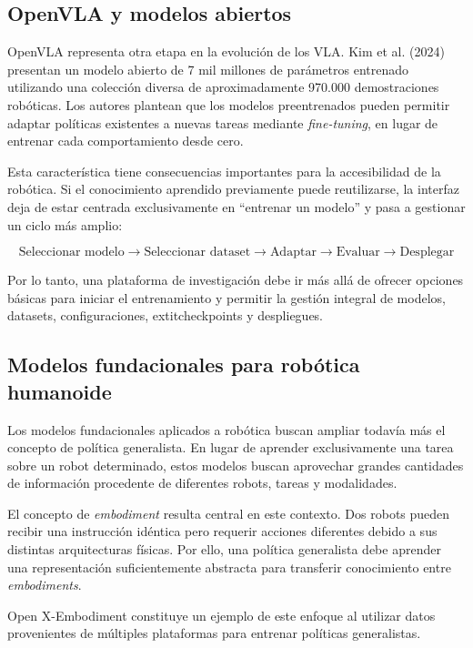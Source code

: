 \documentclass[stu,12pt,floatsintext]{apa7}
\begin{document}
\subsection{OpenVLA y modelos abiertos}

OpenVLA representa otra etapa en la evolución de los VLA. Kim et al. (2024) presentan un modelo abierto de 7 mil millones de parámetros entrenado utilizando una colección diversa de aproximadamente 970.000 demostraciones robóticas. Los autores plantean que los modelos preentrenados pueden permitir adaptar políticas existentes a nuevas tareas mediante \textit{fine-tuning}, en lugar de entrenar cada comportamiento desde cero.

Esta característica tiene consecuencias importantes para la accesibilidad de la robótica. Si el conocimiento aprendido previamente puede reutilizarse, la interfaz deja de estar centrada exclusivamente en ``entrenar un modelo'' y pasa a gestionar un ciclo más amplio:

\begin{equation}
\text{Seleccionar modelo}
\rightarrow
\text{Seleccionar dataset}
\rightarrow
\text{Adaptar}
\rightarrow
\text{Evaluar}
\rightarrow
\text{Desplegar}
\end{equation}

Por lo tanto, una plataforma de investigación debe ir más allá de ofrecer opciones básicas para iniciar el entrenamiento y permitir la gestión integral de modelos, datasets, configuraciones,  extit{checkpoints} y despliegues.

\subsection{Modelos fundacionales para robótica humanoide}

Los modelos fundacionales aplicados a robótica buscan ampliar todavía más el concepto de política generalista. En lugar de aprender exclusivamente una tarea sobre un robot determinado, estos modelos buscan aprovechar grandes cantidades de información procedente de diferentes robots, tareas y modalidades.

El concepto de \textit{embodiment} resulta central en este contexto. Dos robots pueden recibir una instrucción idéntica pero requerir acciones diferentes debido a sus distintas arquitecturas físicas. Por ello, una política generalista debe aprender una representación suficientemente abstracta para transferir conocimiento entre \textit{embodiments}.

Open X-Embodiment constituye un ejemplo de este enfoque al utilizar datos provenientes de múltiples plataformas para entrenar políticas generalistas.
\end{document}

